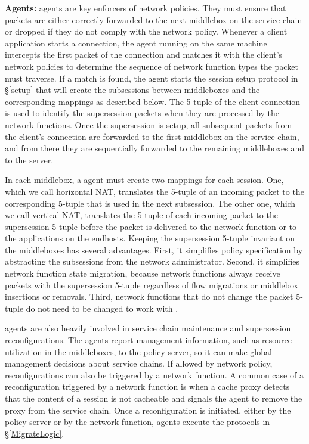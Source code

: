 {\bf   \system Agents:} \system agents   are key enforcers of
network  policies.   They  must ensure    that  packets are  either correctly
forwarded to the next  middlebox on the  service  chain or dropped  if
they  do not   comply with  the  network policy.   Whenever  a  client
application starts a connection, the \system agent running on the same
machine intercepts the  first packet of  the connection and matches it
with  the   client's network  policies to  determine  the  sequence of
network function  types the packet must traverse.   If a match is
found, the agent  starts the session  setup protocol  in \S\ref{setup}
that   will create the     subsessions  between middleboxes  and   the
corresponding mappings as described below.   The 5-tuple of the client connection
is used to  identify the supersession  packets when they are processed
by  the  network  functions.   Once the  supersession  is   setup, all
subsequent  packets from the client's connection  are forwarded to the
first  middlebox  on  the service  chain,   and  from there  they  are
sequentially forwarded to the remaining middleboxes and to the server.

In each middlebox, a  \system agent must  create two mappings for each
session. One, which we call horizontal NAT,  translates the 5-tuple of
an incoming  packet to the corresponding 5-tuple  that is  used in the
next   subsession.  The   other one,  which   we  call vertical   NAT,
translates   the 5-tuple of each   incoming packet to the supersession
5-tuple before the  packet is delivered to the  network function or to
the applications on  the  endhosts.  Keeping the  supersession 5-tuple
invariant    on  the middleboxes  has  several advantages. First,  it
simplifies policy specification by abstracting the subsessions from the network administrator.  Second,  it simplifies network function state
migration, because network functions  always receive packets  with the
supersession  5-tuple   regardless of flow    migrations or  middlebox
insertions  or removals.  Third,  network functions that do not change
the packet 5-tuple do not need to be changed to work with \system.

\system agents are also heavily involved  in service chain maintenance
and  supersession  reconfigurations.   The  agents report   management
information, such as resource utilization  in the middleboxes, to  the
policy server, so  it  can  make  global management  decisions   about
service chains.  If allowed by network policy, reconfigurations can  also be triggered by a  network
function.   A  common case  of a
reconfiguration triggered by a network function is  when a cache proxy
detects that the content of a session is not cacheable and signals the
\system agent to  remove the  proxy  from the service  chain.  Once  a
reconfiguration is  initiated, either by the policy   server or by the
network function,  \system      agents  execute the  protocols      in
\S\ref{MigrateLogic}.






